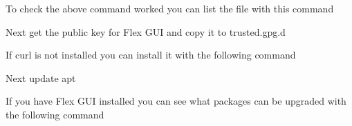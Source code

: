 \documentclass[letterpaper,10pt,english]{sphinxmanual}
\begin{document}
\sphinxAtStartPar
To check the above command worked you can list the file with this command

\begin{sphinxVerbatim}[commandchars=\\\{\}]
 
\end{sphinxVerbatim}


\sphinxAtStartPar
Next get the public key for Flex GUI and copy it to trusted.gpg.d

\begin{sphinxVerbatim}[commandchars=\\\{\}]
      
\end{sphinxVerbatim}

\sphinxAtStartPar
If curl is not installed you can install it with the following command

\begin{sphinxVerbatim}[commandchars=\\\{\}]
   
\end{sphinxVerbatim}

\sphinxAtStartPar
Next update apt

\begin{sphinxVerbatim}[commandchars=\\\{\}]
  
\end{sphinxVerbatim}

\sphinxAtStartPar
If you have Flex GUI installed you can see what packages can be upgraded with
the following command

\begin{sphinxVerbatim}[commandchars=\\\{\}]
  
\end{sphinxVerbatim}
\end{document}
